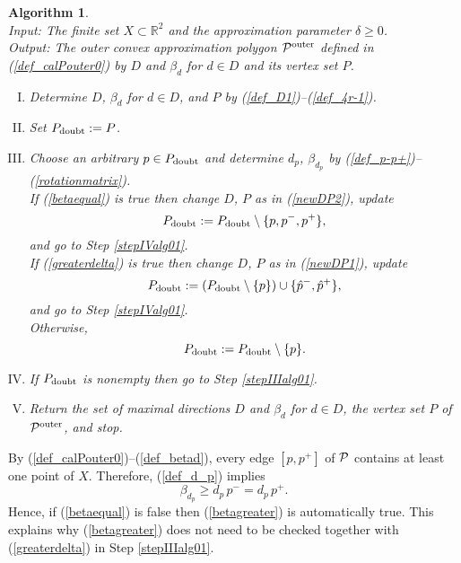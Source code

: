 \documentclass[12pt]{article}
\newtheorem{algorithm}{Algorithm}
\def\R{\mathbb{R}}
\begin{document}
\begin{algorithm}\label{alg01}  \rm \ \\
\emph{Input:} The finite set $X \subset \R^2$ and the approximation parameter $\delta \geq 0$. \\
\emph{Output:} The outer convex approximation polygon ${\cal P}^{\rm outer}$ defined in (\ref{def_calPouter0}) by $D$ and $\beta_d$ for $d \in D$ and its vertex set $P$.
\begin{enumerate}[I.]
\item\label{stepIalg01} 
Determine $D$, $\beta_d$ for $d \in D$, and $P$ by (\ref{def_D1})--(\ref{def_4r-1}).

\item\label{stepIIalg01} Set $P_{\rm doubt} := P$.

\item\label{stepIIIalg01} 
Choose an arbitrary $p \in P_{\rm doubt}$ and determine $d_p$, $\beta_{d_p}$ by (\ref{def_p-p+})--(\ref{rotationmatrix}). \\
If (\ref{betaequal}) is true then change $D$, $P$ as in (\ref{newDP2}), update 
\begin{equation}\label{newPdoubt2}
P_{\rm doubt} := P_{\rm doubt} \setminus \{p, p^-, p^+\},
\end{equation}
and go to Step \ref{stepIValg01}.\\
If %
(\ref{greaterdelta}) is true then change $D$, $P$ as in (\ref{newDP1}), update 
\begin{equation}\label{newPdoubt1}
P_{\rm doubt} := (P_{\rm doubt} \setminus \{p\}) \cup \{\hat p^-, \hat p^+\},
\end{equation}
and go to Step \ref{stepIValg01}.\\
Otherwise, 
\begin{equation}\label{newPdoubt3}
P_{\rm doubt} := P_{\rm doubt} \setminus \{p\}.
\end{equation}

\item\label{stepIValg01} 
If $P_{\rm doubt}$ is nonempty then go to Step \ref{stepIIIalg01}.

\item
Return the set of maximal directions $D$ and $\beta_d$ for $d \in D$, the vertex set $P$ of ${\cal P}^{\rm outer}$, and stop.
\end{enumerate}
\end{algorithm}

By (\ref{def_calPouter0})--(\ref{def_betad}), 
every edge $[p, p^+]$ of $\cal P$ contains at least one point of $X$.
Therefore, (\ref{def_d_p}) implies
\begin{equation*}
\beta_{d_p} \geq d_p\, p^- = d_p\, p^+.
\end{equation*}
Hence, if (\ref{betaequal}) is false then (\ref{betagreater}) is automatically true.
This explains why (\ref{betagreater}) does not need to be checked together with (\ref{greaterdelta}) in Step \ref{stepIIIalg01}.
\end{document}
